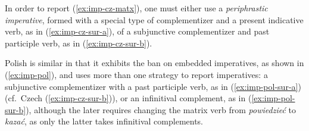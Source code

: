 \documentclass[output=paper,colorlinks,citecolor=brown]{langscibook}
\begin{document}
\noindent In order to report (\ref{ex:imp-cz-matx}), one must either use a \textit{periphrastic imperative}, formed with a special type of complementizer and a present indicative verb, as in (\ref{ex:imp-cz-sur-a}), of a subjunctive complementizer and past participle verb, as in (\ref{ex:imp-cz-sur-b}).%
\ea \label{ex:imp-cz-sur} 
\z\z

\noindent {}Polish is similar in that it exhibits the ban on embedded imperatives, as shown in (\ref{ex:imp-pol}), and uses more than one strategy to report imperatives: a subjunctive complementizer with a past participle verb, as in (\ref{ex:imp-pol-sur-a}) (cf.~Czech (\ref{ex:imp-cz-sur-b})), or an infinitival complement, as in (\ref{ex:imp-pol-sur-b}), although the later requires changing the matrix verb from \emph{powiedzie\'c} to \emph{kaza\'c}, as only the latter takes infinitival complements.%
\ea \label{ex:imp-pol}
\z\z
\end{document}
